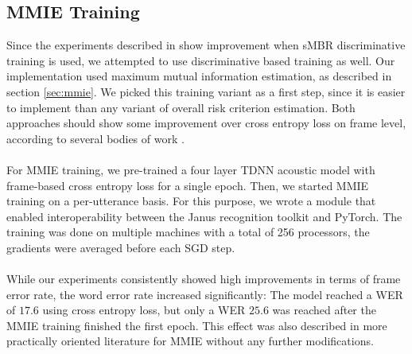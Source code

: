 \subsection{MMIE Training}
Since the experiments described in \cite{peddinti2015jhu} show improvement when sMBR discriminative training is used, we attempted to use discriminative based training as well. Our implementation used maximum mutual information estimation, as described in section \ref{sec:mmie}. We picked this training variant as a first step, since it is easier to implement than any variant of overall risk criterion estimation. Both approaches should show some improvement over cross entropy loss on frame level, according to several bodies of work \cite{povey2005discriminative} \cite{ghoshal2013sequence}. \\ \\
For MMIE training, we pre-trained a four layer TDNN acoustic model with frame-based cross entropy loss for a single epoch. Then, we started MMIE training on a per-utterance basis. For this purpose, we wrote a module that enabled interoperability between the Janus recognition toolkit and PyTorch. The training was done on multiple machines with a total of 256 processors, the gradients were averaged before each SGD step. \\ \\
While our experiments consistently showed high improvements in terms of frame error rate, the word error rate increased significantly: The model reached a WER of $17.6$ using cross entropy loss, but only a WER $25.6$ was reached after the MMIE training finished the first epoch. This effect was also described in more practically oriented literature \cite{su2013error} for MMIE without any further modifications. 

